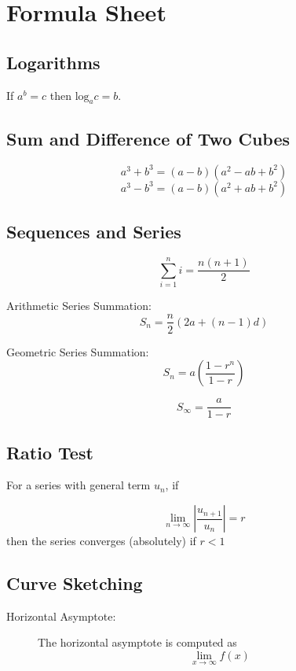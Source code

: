 \documentclass[a4paper,12pt]{article}
\begin{document}
\newpage
	
	\section*{Formula Sheet}
	
	\subsection*{Logarithms}
	If $a^b = c$ then $\mbox{log}_a c = b$.
	\subsection*{Sum and Difference of Two Cubes}
	\[ a^3 + b^3 = (a-b)(a^2 - ab + b^2)\]
	\[ a^3 - b^3 = (a-b)(a^2 + ab + b^2)\]
	
	
	\subsection*{Sequences and Series}
	
	\[ \sum_{i=1}^{n} i = \frac{n(n+1)}{2}\]
	
	Arithmetic Series Summation:
	\[ S_n = \frac{n}{2} \left(2a + (n-1) d \right)\]
	
	Geometric Series Summation:
	\[ S_n = a\left(\frac{1-r^n}{1-r}\right)\]
	
	\[ S_\infty = \frac{a}{1-r}\]

	\subsection*{Ratio Test}
	
	For a series with general term $u_n$, if
	
	\[ \lim_{n \to \infty } \left| \frac{u_{n+1}}{u_n} \right| = r\]
	then the series converges (absolutely) if $r<1$


	
	
\subsection*{Curve Sketching}
\begin{description}
	\item[Horizontal Asymptote:] The horizontal asymptote is computed as
		\[ \lim_{x \to \infty } f(x) \]
\end{description}
	
\end{document}
